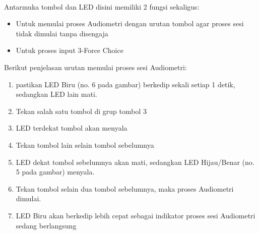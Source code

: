 \documentclass[12pt,]{article}
\begin{document}
	\noindent\makebox[\linewidth]{\rule{\paperwidth}{0.4pt}}\\
	
	Antarmuka tombol dan LED disini memiliki 2 fungsi sekaligus:
	\begin{itemize}
		\item Untuk memulai proses Audiometri dengan urutan tombol agar proses sesi tidak dimulai tanpa disengaja
		\item Untuk proses input 3-Force Choice
	\end{itemize}

	\newpage
	Berikut penjelasan urutan memulai proses sesi Audiometri:
	
	\begin{enumerate}
		\item pastikan LED Biru (no. 6 pada gambar) berkedip sekali setiap 1 detik, sedangkan LED lain mati.
		\item Tekan salah satu tombol di grup tombol 3
		\item LED terdekat tombol akan menyala
		\item Tekan tombol lain selain tombol sebelumnya
		\item LED dekat tombol sebelumnya akan mati, sedangkan LED Hijau/Benar (no. 5 pada gambar) menyala.
		\item Tekan tombol selain dua tombol sebelumnya, maka proses Audiometri dimulai.
		\item LED Biru akan berkedip lebih cepat sebagai indikator proses sesi Audiometri sedang berlangsung	
	\end{enumerate}

	\noindent\makebox[\linewidth]{\rule{\paperwidth}{0.4pt}}\\
\end{document}
